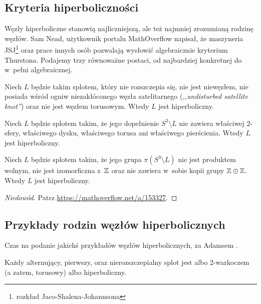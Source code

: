 \subsection{Kryteria hiperboliczności}
Węzły hiperboliczne stanowią najliczniejszą, ale też najmniej zrozumianą rodzinę węzłów.
Sam Nead, użytkownik portalu MathOverflow napisał, że maszyneria JSJ\footnote{rozkład Jaco-Shalena-Johannsona} oraz prace innych osób pozwalają wysłowić algebraicznie kryterium Thurstona.
%
Podajemy trzy równoważne postaci, od najbardziej konkretnej do w~pełni algebraicznej.

\begin{proposition}
    Niech $L$ będzie takim splotem, który nie rozszczepia się, nie jest niewęzłem, nie posiada wśród ogniw niezakłóconego węzła satelitarnego (\emph{,,undisturbed satellite knot''}) oraz nie jest węzłem torusowym.
%
    Wtedy $L$ jest hiperboliczny.
\end{proposition}

\begin{proposition}
    Niech $L$ będzie splotem takim, że jego dopełnienie $S^3 \setminus L$ nie zawiera właściwej 2-sfery, właściwego dysku, właściwego torusa ani właściwego pierścienia.
    Wtedy $L$ jest hiperboliczny.
\end{proposition}

\begin{proposition}
    Niech $L$ będzie splotem takim, że jego grupa $\pi(S^3 \setminus L)$ nie jest produktem wolnym, nie jest izomorficzna z~$\mathbb Z$ oraz nie zawiera w~sobie kopii grupy $\mathbb Z \oplus \mathbb Z$.
    Wtedy $L$ jest hiperboliczny.
\end{proposition}

\begin{proof}[Niedowód]
    Patrz \url{https://mathoverflow.net/a/153327}.
\end{proof}

\subsection{Przykłady rodzin węzłów hiperbolicznych}
Czas na podanie jakichś przykładów węzłów hiperbolicznych, za Adamsem \cite{adams2005}.

\begin{proposition}
    Każdy alternujący, pierwszy, oraz nierozszczepialny splot jest albo 2-warkoczem (a zatem, torusowy) albo hiperboliczny.
%
%
%
\end{proposition}

